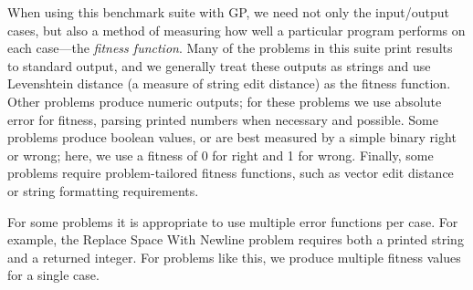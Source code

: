 \documentclass{sig-alternate}
\begin{document}
When using this benchmark suite with GP, we need not only the input/output cases, but also a method of measuring how well a particular program performs on each case---the \textit{fitness function}. 
Many of the problems in this suite print results to standard output, and we generally treat these outputs as strings and use Levenshtein distance (a measure of string edit distance) as the fitness function. Other problems produce numeric outputs; for these problems we use absolute error for fitness, parsing printed numbers when necessary and possible. Some problems produce boolean values, or are best measured by a simple binary right or wrong; here, we use a fitness of 0 for right and 1 for wrong. Finally, some problems require problem-tailored fitness functions, such as vector edit distance or string formatting requirements.

For some problems it is appropriate to use multiple error functions per case. For example, the Replace Space With Newline problem requires both a printed string and a returned integer. For problems like this, we produce multiple fitness values for a single case. 
\end{document}

